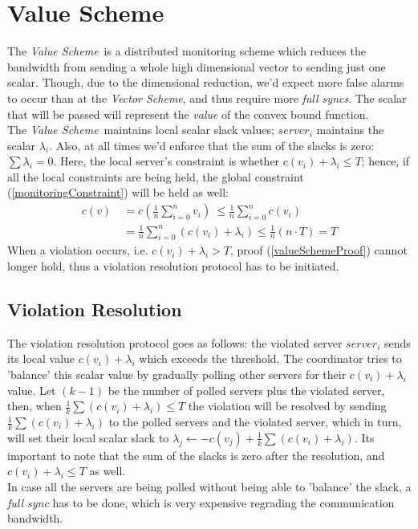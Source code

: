 \documentclass[10pt, conference]{IEEEtran}
\newcommand{\vectorScheme}{\textit{Vector Scheme}}
\newcommand{\valueScheme}{\textit{Value Scheme}}
\begin{document}
\section{Value Scheme}
The \valueScheme \ is a distributed monitoring scheme which reduces the bandwidth from sending a whole high dimensional vector to sending just one scalar.  Though, due to the dimensional reduction, we'd expect more false alarms to occur than at the \vectorScheme , and thus require more \textit{full syncs}. The scalar that will be passed will represent the \textit{value} of the convex bound function.\\
The \valueScheme \  maintains local scalar slack values; $server_i$ maintains the scalar $\lambda _i$. Also, at all times we'd enforce that the sum of the slacks is zero: ${\sum{\lambda _i} = 0}$. Here, the local server's constraint is whether ${c(v_i) + \lambda _i \leq T}$; hence, if all the local constraints are being held, the global constraint (\ref{monitoringConstraint}) will be held as well:
\begin{equation}
\label{valueSchemeProof}
\begin{aligned}
 c(v)  \
	    &=   c\left(\frac{1}{n} \sum\limits_{i=0}^{n}{v_i}\right)  \
       \leq   \frac{1}{n} \sum\limits_{i=0}^{n}c(v_i) \\
        &=    \frac{1}{n} \sum\limits_{i=0}^{n}{(c(v_i) + \lambda _i)}
       \leq   \frac{1}{n}(n \cdot T)
        = T
\end{aligned}
\end{equation}
When a violation occurs, i.e. ${c(v_i) + \lambda _i > T}$, proof (\ref{valueSchemeProof}) cannot longer hold, thus a violation resolution protocol has to be initiated.
\subsection{Violation Resolution}
The violation resolution protocol goes as follows: the violated server $server_i$ sends its local value ${c(v_i) + \lambda _i}$ which exceeds the threshold. The coordinator tries to 'balance' this scalar value by gradually polling other servers for their ${c(v_i) + \lambda _i}$ value. Let ${(k-1)}$ be the number of polled servers plus the violated server, then, when ${\frac{1}{k}\sum{(c(v_i) + \lambda _i)} \leq T}$ the violation will be resolved by sending ${\frac{1}{k}\sum{(c(v_i) + \lambda _i )}}$ to the polled servers and the violated server, which in turn, will set their local scalar slack to ${\lambda _j \leftarrow -c(v_j) + \frac{1}{k}\sum{(c(v_i) + \lambda _i)}}$. Its important to note that the sum of the slacks is zero after the resolution, and ${c(v_i) + \lambda _i \leq T}$ as well. \\
In case all the servers are being polled without being able to 'balance' the slack, a \textit{full sync} has to be done, which is very expensive regrading the communication bandwidth.
\end{document}
